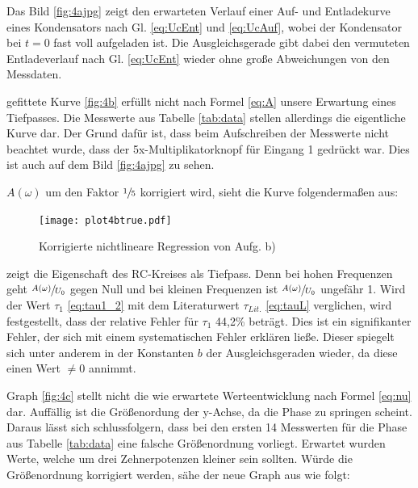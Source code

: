 
Das Bild \ref{fig:4ajpg} zeigt den erwarteten Verlauf einer Auf- und Entladekurve
eines Kondensators nach Gl. \eqref{eq:UcEnt} und \eqref{eq:UcAuf}, wobei der Kondensator bei $t=0$ fast voll aufgeladen ist.
Die Ausgleichsgerade gibt dabei den vermuteten Entladeverlauf nach Gl. \eqref{eq:UcEnt} wieder 
ohne große Abweichungen von den Messdaten.


 \justifying gefittete Kurve \ref{fig:4b} erfüllt nicht nach Formel \eqref{eq:A} unsere Erwartung eines Tiefpasses. 
Die Messwerte aus Tabelle \ref{tab:data} stellen allerdings die eigentliche Kurve
dar. Der Grund dafür ist, dass beim Aufschreiben der Messwerte nicht beachtet wurde,
dass der 5x-Multiplikatorknopf für Eingang 1 gedrückt war. Dies ist auch auf dem Bild \ref{fig:4ajpg}
zu sehen.

\newpage
{} \justifying $A(\omega)$ um den Faktor $\sfrac{1}{5}$ korrigiert wird, sieht die Kurve 
folgendermaßen aus:

\begin{figure}[H]
    \texttt{[image: plot4btrue.pdf]}
    \centering
    \caption{Korrigierte nichtlineare Regression von Aufg. b)}
    \label{fig:4btrue}
\end{figure}


 \justifying zeigt die Eigenschaft des RC-Kreises als Tiefpass.
Denn bei hohen Frequenzen geht $\sfrac{A(\omega)}{U_0}$ gegen Null und bei kleinen
Frequenzen ist $\sfrac{A(\omega)}{U_0}$ ungefähr 1.
Wird der Wert $\tau_1$ \eqref{eq:tau1_2} mit dem Literaturwert $\tau_{Lit.}$
\eqref{eq:tauL} verglichen, wird festgestellt, dass der relative Fehler für $\tau_1$ 
44,2\% beträgt. Dies ist ein signifikanter Fehler, der sich mit einem  
systematischen Fehler erklären ließe. Dieser spiegelt sich unter anderem 
in der Konstanten $b$ der Ausgleichsgeraden wieder, da diese einen Wert $\ne 0$ 
annimmt. 


 \justifying Graph \ref{fig:4c} stellt nicht die wie erwartete Werteentwicklung nach Formel
\eqref{eq:nu} dar. Auffällig ist die Größenordung der y-Achse, da die Phase zu
springen scheint. Daraus lässt sich schlussfolgern, dass bei den ersten 14 Messwerten
für die Phase aus Tabelle \ref{tab:data} eine falsche Größenordnung vorliegt.
Erwartet wurden Werte, welche um drei Zehnerpotenzen kleiner sein sollten. 
Würde die Größenordnung korrigiert werden, sähe der neue Graph aus wie folgt:

